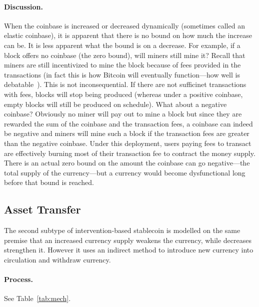 \paragraph{Discussion.} When the coinbase is increased or decreased dynamically (sometimes called an elastic coinbase), it is apparent that there is no bound on how much the increase can be. It is less apparent what the bound is on a decrease. For example, if a block offers no coinbase (the zero bound), will miners still mine it? Recall that miners are still incentivized to mine the block because of fees provided in the transactions (in fact this is how Bitcoin will eventually function---how well is debatable~\cite{carlsten2016instability}). This is not inconsequential. If there are not sufficinet transactions with fees, blocks will stop being produced (whereas under a positive coinbase, empty blocks will still be produced on schedule). What about a negative coinbase? Obviously no miner will pay out to mine a block but since they are rewarded the sum of the coinbase and the transaction fees, a coinbase can indeed be negative and miners will mine such a block if the transaction fees are greater than the negative coinbase. Under this deployment, users paying fees to transact are effectively burning most of their transaction fee to contract the money supply. There is an actual zero bound on the amount the coinbase can go negative---the total supply of the currency---but a currency would become dysfunctional long before that bound is reached.




\subsection{Asset Transfer}
\label{sec:basecoin}

The second subtype of intervention-based stablecoin is modelled on the same premise that an increased currency supply weakens the currency, while decreases strengthen it. However it uses an indirect method to introduce new currency into circulation and withdraw currency. 

\paragraph{Process.} See Table~\ref{tab:mech}.

